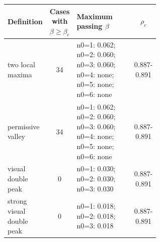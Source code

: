 \begin{tabular}{L{0.21\linewidth} c L{0.39\linewidth} c}
\toprule
Definition & Cases with $\beta\geq\beta_c$ & Maximum passing $\beta$ & $\rho_c$ \\
\midrule
two local maxima & 34 & n0=1: 0.062; n0=2: 0.060; n0=3: 0.060; n0=4: none; n0=5: none; n0=6: none & 0.887-0.891 \\
permissive valley & 34 & n0=1: 0.062; n0=2: 0.060; n0=3: 0.060; n0=4: none; n0=5: none; n0=6: none & 0.887-0.891 \\
visual double peak & 0 & n0=1: 0.030; n0=2: 0.030; n0=3: 0.030 & 0.887-0.891 \\
strong visual double peak & 0 & n0=1: 0.018; n0=2: 0.018; n0=3: 0.018 & 0.887-0.891 \\
\bottomrule
\end{tabular}
